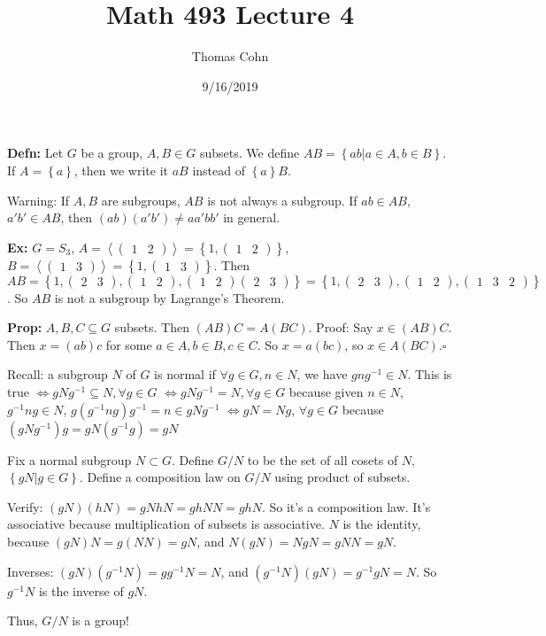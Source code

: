 \documentclass[10pt,letterpaper]{article}
\author{Thomas Cohn}
\title{Math 493 Lecture 4}
\date{9/16/2019} %
\newcommand{\n}{\hfill\break}
\newcommand{\hangblock}[2]{\par\noindent\settowidth{\hangindent}{\textbf{#1: }}\textbf{#1: }\!\!\!#2}
\newcommand{\defn}[1]{\hangblock{Defn}{#1}}
\newcommand{\prop}[1]{\hangblock{Prop}{#1}}
\newcommand{\ex}[1]{\hangblock{Ex}{#1}}
\newcommand{\proven}{\;$\square$\n}
\newcommand{\set}[1]{\left\{#1\right\}}
\newcommand{\inv}{^{-1}}
\newcommand{\smallPMatrix}[1]{\paren{\begin{smallmatrix}#1\end{smallmatrix}}}
\newcommand{\generated}[1]{\left<#1\right>}
\newcommand{\cycle}[1]{\smallPMatrix{#1}}
\newcommand{\paren}[1]{\left(#1\right)}
\begin{document}
\maketitle
\setlength\RaggedRightParindent{\parindent}
\RaggedRight

\defn{
	Let $G$ be a group, $A,B\in{}G$ subsets. We define $AB=\set{ab|a\in{}A,b\in{}B}$. If $A=\set{a}$, then we write it $aB$ instead of $\set{a}B$.\n
}

\par\noindent
Warning: If $A,B$ are subgroups, $AB$ is not always a subgroup. If $ab\in{}AB$, $a'b'\in{}AB$, then\n
$(ab)(a'b')\ne{}aa'bb'$ in general.\n

\ex{
	$G=S_{3}$, $A=\generated{\cycle{1 & 2}}=\set{1,\cycle{1 & 2}}$, $B=\generated{\cycle{1 & 3}}=\set{1, \cycle{1 & 3}}$. Then\n
	$AB=\set{1,\cycle{2 & 3},\cycle{1 & 2},\cycle{1 & 2}\cycle{2 & 3}}=\set{1,\cycle{2 & 3},\cycle{1 & 2},\cycle{1 & 3 & 2}}$. So $AB$ is not a subgroup by Lagrange's Theorem.\n
}

\prop{
	$A,B,C\subseteq{}G$ subsets. Then $(AB)C=A(BC)$.\n
	Proof: Say $x\in(AB)C$. Then $x=(ab)c$ for some $a\in{}A,b\in{}B,c\in{}C$. So $x=a(bc)$, so $x\in{}A(BC)$.\proven
}

\par\noindent
Recall: a subgroup $N$ of $G$ is normal if $\forall{}g\in{}G,n\in{}N$, we have $gng\inv\in{}N$. This is true\n
$\Leftrightarrow{}gNg\inv\subseteq{}N,\forall{}g\in{}G$\n
$\Leftrightarrow{}gNg\inv=N,\forall{}g\in{}G$ because given $n\in{}N$, $g\inv{}ng\in{}N$, $g(g\inv{}ng)g\inv=n\in{}gNg\inv$\n
$\Leftrightarrow{}gN=Ng$, $\forall{}g\in{}G$ because $(gNg\inv)g=gN(g\inv{}g)=gN$\n

\par\noindent
Fix a normal subgroup $N\subset{}G$. Define $G/N$ to be the set of all cosets of $N$, $\set{gN|g\in{}G}$. Define a composition law on $G/N$ using product of subsets.\n

\par\noindent
Verify: $(gN)(hN)=gNhN=ghNN=ghN$. So it's a composition law. It's associative because multiplication of subsets is associative. $N$ is the identity, because $(gN)N=g(NN)=gN$, and\n
$N(gN)=NgN=gNN=gN$.\n

\par\noindent
Inverses: $(gN)(g\inv{}N)=gg\inv{}N=N$, and $(g\inv{}N)(gN)=g\inv{}gN=N$. So $g\inv{}N$ is the inverse of $gN$.\n

\par\noindent
Thus, $G/N$ is a group!\n
\end{document}
